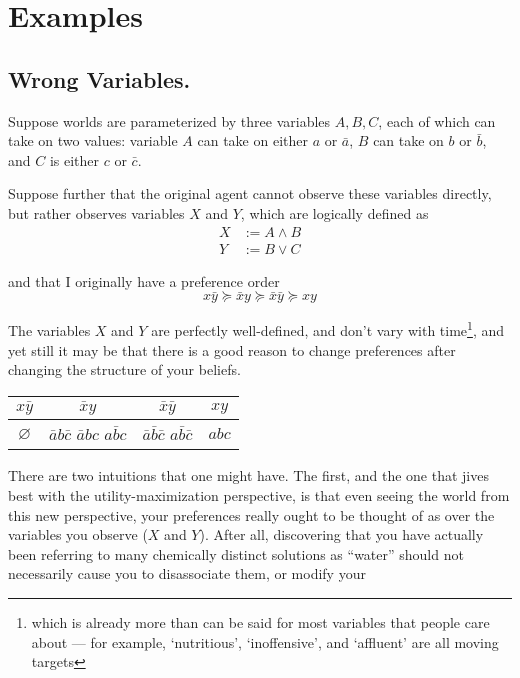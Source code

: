 \documentclass{book}
\newcommand\geqc{\succcurlyeq}
\begin{document}
	\chapter{Examples}
	
	\section{Wrong Variables.}
	Suppose worlds are parameterized by three variables $A, B, C$, each of which can take on two values: variable $A$ can take on either $a$ or $\bar a$, $B$ can take on $b$ or $\bar b$, and $C$ is either $c$ or $\bar c$.
	
	Suppose further that the original agent cannot observe these variables directly, but rather observes variables $X$ and $Y$, which are logically defined as 
	\begin{align*}
		X &:= A \land B \\
		Y &:= B \lor C
	\end{align*}
	
	and that I originally have a preference order
	\[ x \bar y \geqc \bar x y \geqc \bar x \bar y \geqc x y  \]
	
	The variables $X$ and $Y$ are perfectly well-defined, and don't vary with time\footnote{which is already more than can be said for most variables that people care about --- for example, `nutritious', `inoffensive', and `affluent' are all moving targets}, and yet still it may be that there is a good reason to change preferences after changing the structure of your beliefs.
	
	
	
	\begin{center}
		\begin{tabular}{cccc}
			$x \bar y $ & $\bar x y$ & $\bar x \bar y$ & $x y$ \\\hline
			\rule{0pt}{2.3em}$\varnothing$ & \parbox[c]{0.5cm}{$\bar a b \bar c$\\$\bar a b c$ \\ $a \bar b c$} 
				& \parbox[c]{0.5cm}{$\bar a \bar b \bar c$ \\ $a \bar b \bar c$}
				& \parbox[c]{0.5cm}{$abc$} \\[1.3em]\hline
		\end{tabular}
	\end{center}
	\vspace{1em}
	
	
	There are two intuitions that one might have. The first, and the one that jives best with the utility-maximization perspective, is that even seeing the world from this new perspective, your preferences really ought to be thought of as over the variables you observe ($X$ and $Y$). After all, discovering that you have actually been referring to many chemically distinct solutions as ``water'' should not necessarily cause you to disassociate them, or modify your 
	
\end{document}
